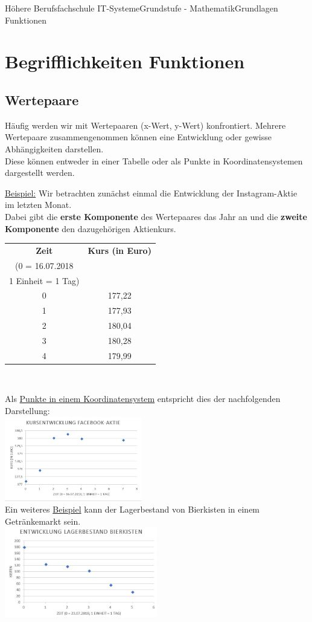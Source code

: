 \documentclass[11pt,twocolumn,oneside,openany,headings=optiontotoc,11pt,numbers=noenddot]{article}
\begin{document}
	\begin{worksheet}{Höhere Berufsfachschule IT-Systeme}{Grundstufe - Mathematik}{Grundlagen Funktionen}
		\setcounter{section}{0}
		\section{Begrifflichkeiten Funktionen}
		\subsection{Wertepaare} Häufig werden wir mit Wertepaaren (x-Wert, y-Wert) konfrontiert. Mehrere Wertepaare zusammengenommen können eine Entwicklung oder gewisse Abhängigkeiten darstellen.\\
		Diese können entweder in einer Tabelle oder als Punkte in Koordinatensystemen dargestellt werden.\\
		\par\bigskip\noindent
		\underline{Beispiel:} Wir betrachten zunächst einmal die Entwicklung der Instagram-Aktie im letzten Monat.\\
		Dabei gibt die \textbf{erste Komponente} des Wertepaares das Jahr an und die \textbf{zweite Komponente} den dazugehörigen Aktienkurs.\\
		\begin{tabularx}{0.45\textwidth}{c|c}
			\textbf{Zeit} & \textbf{Kurs (in Euro)}\\
			(0 = 16.07.2018 & \\
			1 Einheit = 1 Tag) & \\
			\hline
			0 & 177,22\\
			\hline
			1 & 177,93\\
			\hline
			2 & 180,04\\
			\hline
			3 & 180,28\\
			\hline
			4 & 179,99\\
			\hline
		\end{tabularx}\\
		\par\noindent
		Als \underline{Punkte in einem Koordinatensystem} entspricht dies der nachfolgenden Darstellung:\\
		\includegraphics[width=0.45\textwidth]{../99_Bilder/fb.jpg}\\
		Ein weiteres \underline{Beispiel} kann der Lagerbestand von Bierkisten in einem Getränkemarkt sein.\\
		\includegraphics[width=0.5\textwidth]{../99_Bilder/bier.jpg}

\end{worksheet}
\end{document}
